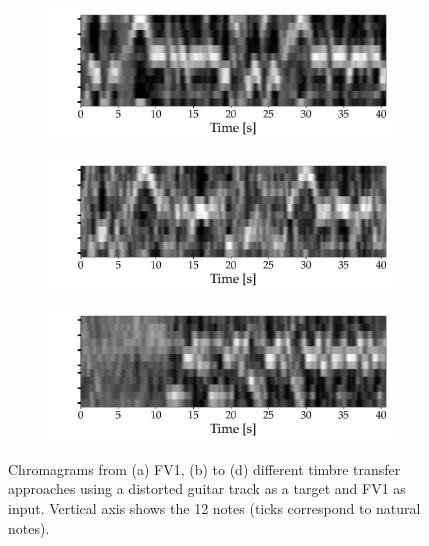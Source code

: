 \begin{figure}[t]
	\begin{subfigure}[b]{0.46\textwidth}
		\includegraphics[width=\textwidth]{img/audioXsynth/plots/chromagram-specgram_406_P_ENV}
	\end{subfigure}
	\hfil
	\begin{subfigure}[b]{0.46\textwidth}
		\includegraphics[width=\textwidth]{img/audioXsynth/plots/chromagram-specgram_mfcc-knn}
	\end{subfigure}
	\hfil
	\begin{subfigure}[b]{0.46\textwidth}
		\includegraphics[width=\textwidth]{img/audioXsynth/plots/chromagram-specgram_flatten}
	\end{subfigure}
	
	
	\caption{Chromagrams from (a) FV1, (b) to (d) different timbre transfer approaches using a distorted guitar track as a target and FV1 as input. Vertical axis shows the 12 notes (ticks correspond to natural notes).}
	\label{fig:chromas}
\end{figure}

